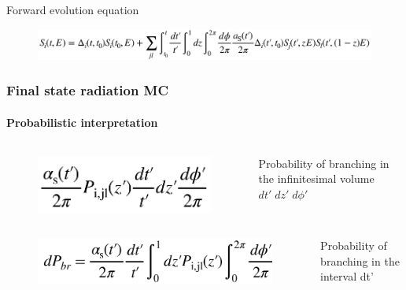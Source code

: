 \documentclass[aspectratio=43]{beamer}
\begin{document}
\begin{frame}
\begin{columns}
	\end{columns}

	\vspace{0.1cm}
	
	\footnotesize Forward evolution equation
	\begin{figure}
		\includegraphics[width = 10 cm]{plots/shower_2_eq.png}
	\end{figure}

\end{frame}

\begin{frame}

	\frametitle{Final state radiation MC}
	\framesubtitle{Probabilistic interpretation}

	\begin{columns} 
	
		
		\begin{figure}
			\includegraphics[width = 2.5 cm]{plots/probability1.png}
		\end{figure}
		
		
		\footnotesize Probability of branching in the infinitesimal volume $dt'\; dz'\; d\phi'$

	\end{columns}

	\begin{columns} 
	
		\column{0.5\textwidth}
		
		\begin{figure}
			\includegraphics[width = 4 cm]{plots/probability2.png}
		\end{figure}
		
		\column{0.5\textwidth}
		
		\footnotesize Probability of branching in the interval dt'

	\end{columns}

	\begin{columns} 
	

\end{columns}
\end{frame}
\end{document}
